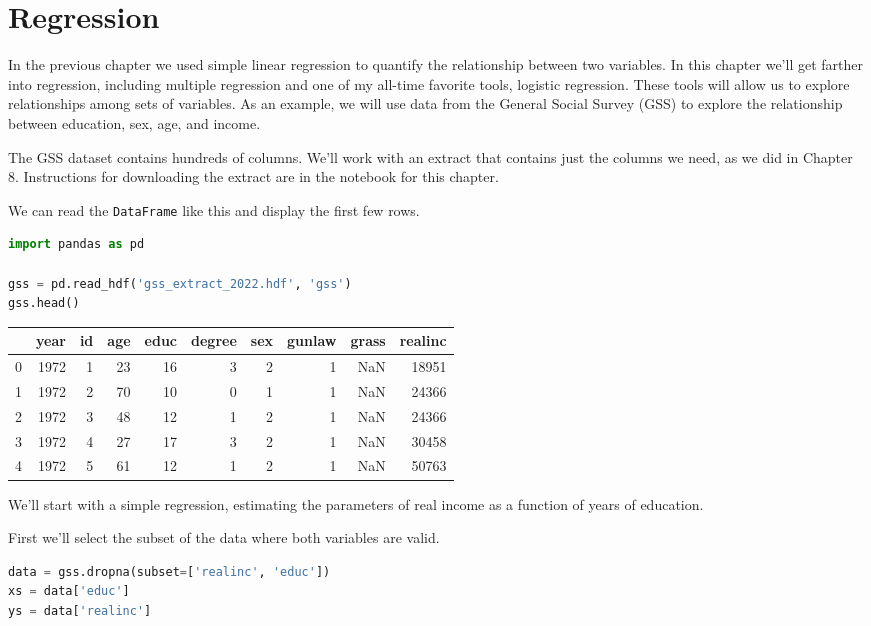 \chapter{Regression}\label{regression}

In the previous chapter we used simple linear regression to quantify the
relationship between two variables. In this chapter we'll get farther
into regression, including multiple regression and one of my all-time
favorite tools, logistic regression. These tools will allow us to
explore relationships among sets of variables. As an example, we will
use data from the General Social Survey (GSS) to explore the
relationship between education, sex, age, and income.

The GSS dataset contains hundreds of columns. We'll work with an extract
that contains just the columns we need, as we did in Chapter 8.
Instructions for downloading the extract are in the notebook for this
chapter.

We can read the \passthrough{\lstinline!DataFrame!} like this and
display the first few rows.

\begin{lstlisting}[language=Python,style=source]
import pandas as pd

gss = pd.read_hdf('gss_extract_2022.hdf', 'gss')
gss.head()
\end{lstlisting}

\begin{tabular}{lrrrrrrrrr}
\toprule
 & year & id & age & educ & degree & sex & gunlaw & grass & realinc \\
\midrule
0 & 1972 & 1 & 23 & 16 & 3 & 2 & 1 & NaN & 18951 \\
1 & 1972 & 2 & 70 & 10 & 0 & 1 & 1 & NaN & 24366 \\
2 & 1972 & 3 & 48 & 12 & 1 & 2 & 1 & NaN & 24366 \\
3 & 1972 & 4 & 27 & 17 & 3 & 2 & 1 & NaN & 30458 \\
4 & 1972 & 5 & 61 & 12 & 1 & 2 & 1 & NaN & 50763 \\
\bottomrule
\end{tabular}

We'll start with a simple regression, estimating the parameters of real
income as a function of years of education.

\pagebreak

First we'll select the subset of the data where both variables are valid.

\begin{lstlisting}[language=Python,style=source]
data = gss.dropna(subset=['realinc', 'educ'])
xs = data['educ']
ys = data['realinc']
\end{lstlisting}

